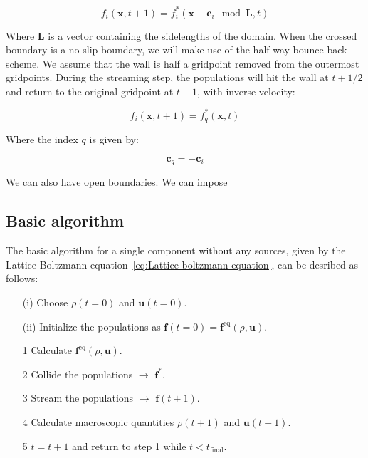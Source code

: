 \begin{equation}\label{eq:Periodic streaming step}
    f_i(\bm{x}, t+1) = f_i^*(\bm{x} - \bm{c}_i \mod \bm{L} , t)
\end{equation}

Where $\bm{L}$ is a vector containing the sidelengths of the domain. When the crossed boundary is a no-slip boundary, we will make use of the half-way bounce-back scheme. We assume that the wall is half a gridpoint removed from the outermost gridpoints. During the streaming step, the populations will hit the wall at $t + 1/2$ and return to the original gridpoint at $t + 1$, with inverse velocity:

\begin{equation}\label{eq:No-slip streaming step}
    f_i(\bm{x}, t+1) = f_q^*(\bm{x}, t)
\end{equation}

Where the index $q$ is given by:

\begin{equation}\label{eq:Bounce-back velocity component}
    \bm{c}_q = -\bm{c}_i
\end{equation}

We can also have open boundaries. We can impose 

\subsection{Basic algorithm}\label{subsec:Basic algorithm}
The basic algorithm for a single component without any sources, given by the Lattice Boltzmann equation~\ref{eq:Lattice boltzmann equation}, can be desribed as follows:

\begin{itemize}\label{it:Basic algorithm}
    \item[(i)] Choose $\rho(t=0)$ and $\bm{u}(t=0)$.
    \item[(ii)] Initialize the populations as $\bm{f}(t=0) = \bm{f}^{\text{eq}}(\rho, \bm{u})$. 
    \item[1] Calculate $\bm{f}^{\text{eq}}(\rho, \bm{u})$.
    \item[2] Collide the populations $\rightarrow$ $\bm{f}^*$.
    \item[3] Stream the populations $\rightarrow$ $\bm{f}(t + 1)$.
    \item[4] Calculate macroscopic quantities $\rho(t + 1)$ and $\bm{u}(t + 1)$.
    \item[5] $t = t + 1$ and return to step 1 while $t < t_{\text{final}}$.
\end{itemize}

